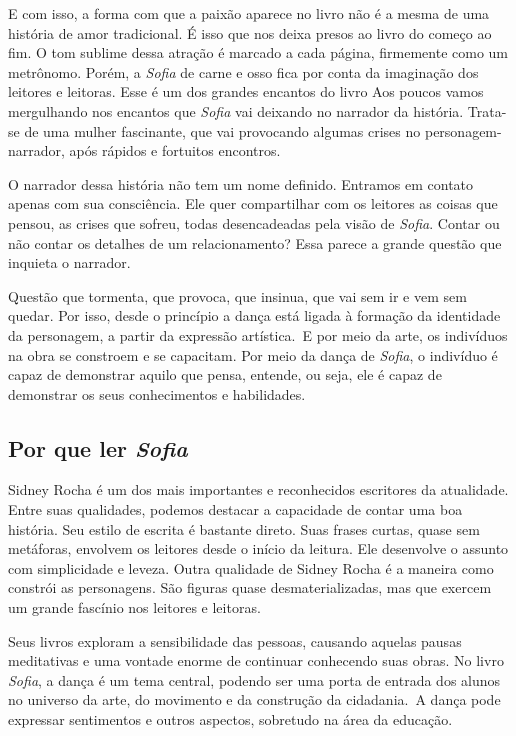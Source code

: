 \documentclass[12pt]{extarticle}
\begin{document}
E com isso, a forma com que a paixão aparece no livro não é a mesma
de uma história de amor tradicional. É isso que nos deixa presos ao livro do
começo ao fim. O tom sublime dessa atração é marcado a cada página, firmemente
como um metrônomo. Porém, a \textit{Sofia} de carne e osso fica por conta da imaginação
dos leitores e leitoras. Esse é um dos grandes encantos do livro Aos poucos
vamos mergulhando nos encantos que \textit{Sofia} vai deixando no narrador da história.
Trata-se de uma mulher fascinante, que vai provocando algumas crises no
personagem-narrador, após rápidos e fortuitos encontros.  

O narrador dessa
história não tem um nome definido. Entramos em contato apenas com sua
consciência. Ele quer compartilhar com os leitores as coisas que pensou, as
crises que sofreu, todas desencadeadas pela visão de \textit{Sofia}. Contar ou não
contar os detalhes de um relacionamento? Essa parece a grande questão que
inquieta o narrador.  

Questão que tormenta, que provoca, que insinua, que vai
sem ir e vem sem quedar. Por isso, desde o princípio a dança está ligada à
formação da identidade da personagem, a partir da expressão artística. E por
meio da arte, os indivíduos na obra se constroem e se capacitam. Por meio da
dança de \textit{Sofia}, o indivíduo é capaz de demonstrar aquilo que pensa, entende, ou
seja, ele é capaz de demonstrar os seus conhecimentos e habilidades.   

\subsection{Por que ler \textit{Sofia}}

Sidney Rocha é um dos mais importantes e reconhecidos
escritores da atualidade. Entre suas qualidades, podemos destacar a capacidade
de contar uma boa história. Seu estilo de escrita é bastante direto. Suas
frases curtas, quase sem metáforas, envolvem os leitores desde o início da
leitura. Ele desenvolve o assunto com simplicidade e leveza. Outra qualidade de
Sidney Rocha é a maneira como constrói as personagens. São figuras quase
desmaterializadas, mas que exercem um grande fascínio nos leitores e leitoras. 

Seus livros exploram a sensibilidade das pessoas, causando aquelas pausas
meditativas e uma vontade enorme de continuar conhecendo suas obras.  No livro
\textit{Sofia}, a dança é um tema central, podendo ser uma porta de entrada dos alunos
no universo da arte, do movimento e da construção da cidadania. A dança pode
expressar sentimentos e outros aspectos, sobretudo na área da educação.
\end{document}
